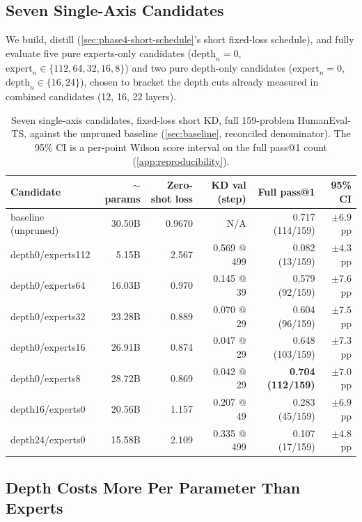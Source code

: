 \documentclass{article}
\theoremstyle{plain}
\theoremstyle{definition}
\theoremstyle{remark}
\begin{document}
\subsection{Seven Single-Axis Candidates}
\label{sec:pure-axis-results}

We build, distill (\cref{sec:phase4-short-schedule}'s short fixed-loss
schedule), and fully evaluate five pure experts-only candidates
($\mathrm{depth}_n{=}0$, $\mathrm{expert}_n \in \{112,64,32,16,8\}$) and
two pure depth-only candidates ($\mathrm{expert}_n{=}0$,
$\mathrm{depth}_n \in \{16,24\}$), chosen to bracket the depth cuts
already measured in combined candidates (12, 16, 22 layers).

\begin{table}[t]
\centering
\scriptsize
\setlength{\tabcolsep}{3pt}
\begin{tabular}{lrrrrr}
\toprule
Candidate & $\sim$params & Zero-shot loss & KD val (step) & Full pass@1 & 95\% CI \\
\midrule
baseline (unpruned) & 30.50B & 0.9670 & N/A & 0.717 (114/159) & $\pm 6.9$pp \\
depth0/experts112 & 5.15B & 2.567 & 0.569 @ 499 & 0.082 (13/159) & $\pm 4.3$pp \\
depth0/experts64 & 16.03B & 0.970 & 0.145 @ 39 & 0.579 (92/159) & $\pm 7.6$pp \\
depth0/experts32 & 23.28B & 0.889 & 0.070 @ 29 & 0.604 (96/159) & $\pm 7.5$pp \\
depth0/experts16 & 26.91B & 0.874 & 0.047 @ 29 & 0.648 (103/159) & $\pm 7.3$pp \\
depth0/experts8 & 28.72B & 0.869 & 0.042 @ 29 & \textbf{0.704 (112/159)} & $\pm 7.0$pp \\
depth16/experts0 & 20.56B & 1.157 & 0.207 @ 49 & 0.283 (45/159) & $\pm 6.9$pp \\
depth24/experts0 & 15.58B & 2.109 & 0.335 @ 499 & 0.107 (17/159) & $\pm 4.8$pp \\
\bottomrule
\end{tabular}
\caption{Seven single-axis candidates, fixed-loss short KD, full
159-problem HumanEval-TS, against the unpruned baseline
(\cref{sec:baseline}, reconciled denominator). The 95\% CI is a per-point
Wilson score interval on the full pass@1 count (\cref{app:reproducibility}).}
\label{table:pure-axis-results}
\end{table}

\subsection{Depth Costs More Per Parameter Than Experts}
\label{sec:depth-vs-experts}
\end{document}
